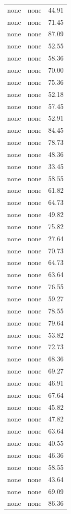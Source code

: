 \begin{tabular}{rrr}
none & none & 44.91 \\
none & none & 71.45 \\
none & none & 87.09 \\
none & none & 52.55 \\
none & none & 58.36 \\
none & none & 70.00 \\
none & none & 75.36 \\
none & none & 52.18 \\
none & none & 57.45 \\
none & none & 52.91 \\
none & none & 84.45 \\
none & none & 78.73 \\
none & none & 48.36 \\
none & none & 33.45 \\
none & none & 58.55 \\
none & none & 61.82 \\
none & none & 64.73 \\
none & none & 49.82 \\
none & none & 75.82 \\
none & none & 27.64 \\
none & none & 70.73 \\
none & none & 64.73 \\
none & none & 63.64 \\
none & none & 76.55 \\
none & none & 59.27 \\
none & none & 78.55 \\
none & none & 79.64 \\
none & none & 53.82 \\
none & none & 72.73 \\
none & none & 68.36 \\
none & none & 69.27 \\
none & none & 46.91 \\
none & none & 67.64 \\
none & none & 45.82 \\
none & none & 47.82 \\
none & none & 63.64 \\
none & none & 40.55 \\
none & none & 46.36 \\
none & none & 58.55 \\
none & none & 43.64 \\
none & none & 69.09 \\
none & none & 86.36 \\

\end{tabular}
